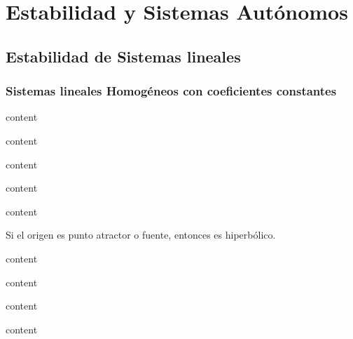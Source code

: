 \part{Estabilidad y Sistemas Autónomos}

\chapter{Estabilidad de Sistemas lineales}

\section{Sistemas lineales Homogéneos con coeficientes constantes}

\begin{defn}
  content
\end{defn}

\begin{defn}
  content
\end{defn}

\begin{defn}
  content
\end{defn}

\begin{defn}
  content
\end{defn}

\begin{defn}
  content
\end{defn}

\begin{obs}
  Si el origen es punto atractor o fuente, entonces es hiperbólico.
\end{obs}

\begin{defn}
  content
\end{defn}

\begin{defn}
  content
\end{defn}

\begin{prop}
  content
\end{prop}

\begin{prop}
  content
\end{prop}

